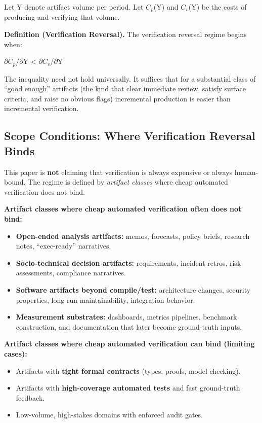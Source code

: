 \documentclass[11pt,a4paper]{article}
\providecommand{\tightlist}{\setlength{\itemsep}{0pt}\setlength{\parskip}{0pt}}
\begin{document}
Let Y denote artifact volume per period. Let $C_p$(Y) and $C_v$(Y) be the costs of producing and verifying that volume.

\textbf{Definition (Verification Reversal).} The verification reversal regime begins when:

$\partial C_p$/$\partial$Y < $\partial C_v$/$\partial$Y

The inequality need not hold universally. It suffices that for a substantial class of ``good enough'' artifacts (the kind that clear immediate review, satisfy surface criteria, and raise no obvious flags) incremental production is easier than incremental verification.

\hypertarget{scope-conditions-where-verification-reversal-binds}{%
\subsection{ Scope Conditions: Where Verification Reversal Binds}\label{scope-conditions-where-verification-reversal-binds}}

This paper is \textbf{not} claiming that verification is always expensive or always human-bound. The regime is defined by \emph{artifact classes} where cheap automated verification does not bind.

\textbf{Artifact classes where cheap automated verification often does not bind:}

\begin{itemize}
\tightlist
\item
  \textbf{Open-ended analysis artifacts:} memos, forecasts, policy briefs, research notes, ``exec-ready'' narratives.
\item
  \textbf{Socio-technical decision artifacts:} requirements, incident retros, risk assessments, compliance narratives.
\item
  \textbf{Software artifacts beyond compile/test:} architecture changes, security properties, long-run maintainability, integration behavior.
\item
  \textbf{Measurement substrates:} dashboards, metrics pipelines, benchmark construction, and documentation that later become ground-truth inputs.
\end{itemize}

\textbf{Artifact classes where cheap automated verification can bind (limiting cases):}

\begin{itemize}
\tightlist
\item
  Artifacts with \textbf{tight formal contracts} (types, proofs, model checking).
\item
  Artifacts with \textbf{high-coverage automated tests} and fast ground-truth feedback.
\item
  Low-volume, high-stakes domains with enforced audit gates.
\end{itemize}
\end{document}
